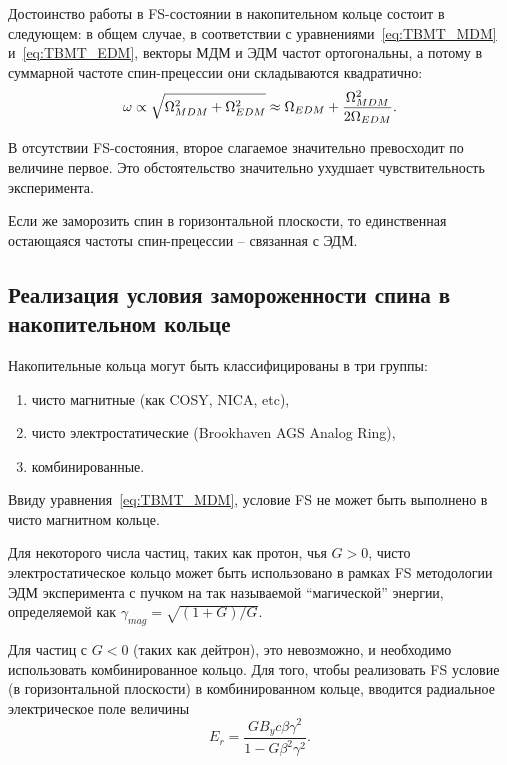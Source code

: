 Достоинство работы в FS-состоянии в накопительном кольце состоит в
следующем: в общем случае, в соответствии с уравнениями~\eqref{eq:TBMT_MDM} и~\eqref{eq:TBMT_EDM}, 
векторы МДМ и ЭДМ частот ортогональны, а потому в суммарной частоте
спин-прецессии они складываются квадратично:
\[
\omega \propto \sqrt{\Omega_{MDM}^2 + \Omega_{EDM}^2} \approx \Omega_{EDM} + \frac{\Omega_{MDM}^2}{2\Omega_{EDM}}.
\]

В отсутствии FS-состояния, второе слагаемое значительно превосходит по величине первое.
Это обстоятельство значительно ухудшает чувствительность эксперимента.

Если же заморозить спин в горизонтальной плоскости, то единственная
остающаяся частоты спин-прецессии -- связанная с ЭДМ.

\subsection{Реализация условия замороженности спина в накопительном кольце}\label{sec:FS_in_a_ring}
Накопительные кольца могут быть классифицированы в три группы:
\begin{enumerate}
	\item чисто магнитные (как COSY, NICA, etc),
	\item чисто электростатические (Brookhaven AGS Analog Ring),
	\item комбинированные.
\end{enumerate}

Ввиду уравнения~\eqref{eq:TBMT_MDM}, условие FS не может быть
выполнено в чисто магнитном кольце.

Для некоторого числа частиц, таких как протон, чья $G>0$, чисто
электростатическое кольцо может быть использовано в рамках FS
методологии ЭДМ эксперимента с пучком на так называемой ``магической''
энергии, определяемой как $\gamma_{mag} = \sqrt{(1+G)/G}$.

Для частиц с $G<0$ (таких как дейтрон), это невозможно, и необходимо
использовать комбинированное кольцо. Для того, чтобы реализовать FS
условие (в горизонтальной плоскости) в комбинированном кольце, 
вводится радиальное электрическое поле величины~\cite[стр.~10]{BNL:Deuteron2008}
\begin{equation}\label{eq:FS_Er}
E_r = \frac{GB_yc\beta\gamma^2}{1-G\beta^2\gamma^2}.
\end{equation}